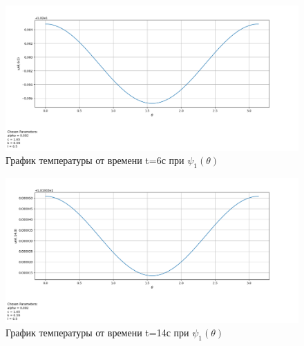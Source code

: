 {{\begin{figure}[H]
    \centering                             
	\includegraphics[width=\textwidth,height=\textheight,keepaspectratio]{kir/var_1_t_6.png}                 
	\centering\caption{ График температуры от времени t=6с при $\psi_1(\theta)$}
	\label{grapics1}                           
\end{figure}               

\begin{figure}[H]
    \centering                             
	\includegraphics[width=\textwidth,height=\textheight,keepaspectratio]{kir/var_1_t_14.png}                 
	\caption{ График температуры от времени t=14с при $\psi_1(\theta)$}
	\label{grapics2}                           
\end{figure}                                  

}}
